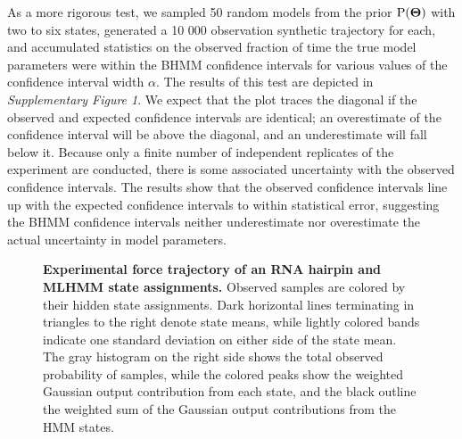 \documentclass[aps,pre,twocolumn,superscriptaddress,nofootinbib,longbibliography]{revtex4-1}
\newcommand{\bfm}[1]{{\bf #1}}
\renewcommand{\Pr}{\mathrm{P}}
\begin{document}
{As a more rigorous test, we sampled 50 random models from the prior $\Pr(\bfm{\Theta})$ with two to six states, generated a 10 000 observation synthetic trajectory for each, and accumulated statistics on the observed fraction of time the true model parameters were within the BHMM confidence intervals for various values of the confidence interval width $\alpha$.
The results of this test are depicted in \emph{Supplementary Figure 1}. %
We expect that the plot traces the diagonal if the observed and expected confidence intervals are identical; an overestimate of the confidence interval will be above the diagonal, and an underestimate will fall below it.
Because only a finite number of independent replicates of the experiment are conducted, there is some associated uncertainty with the observed confidence intervals.
The results show that the observed confidence intervals line up with the expected confidence intervals to within statistical error, suggesting the BHMM confidence intervals neither underestimate nor overestimate the actual uncertainty in model parameters.



\begin{figure}[tbp]
\noindent
{}
\caption{{\bf Experimental force trajectory of {\color{red} an RNA} hairpin and MLHMM state assignments.}
Observed samples are colored by their hidden state assignments.
Dark horizontal lines terminating in triangles to the right denote state means, while lightly colored bands indicate one standard deviation on either side of the state mean.
The gray histogram on the right side shows the total observed probability of samples, while the colored peaks show the weighted Gaussian output contribution from each state, and the black outline the weighted sum of the Gaussian output contributions from the HMM states.
\label{figure:p5ab-observed-trajectory}}
\end{figure}

}
\end{document}
